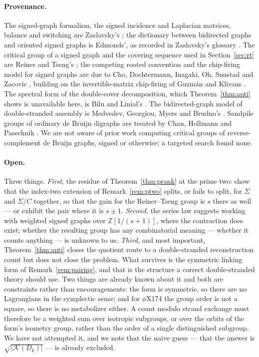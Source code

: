 \documentclass[11pt]{article}
\theoremstyle{plain}
\theoremstyle{definition}
\theoremstyle{remark}
\newcommand{\Z}{\mathbb{Z}}
\newcommand{\K}{\mathcal{K}}
\newcommand{\Sig}{\Sigma}
\begin{document}
\paragraph{Provenance.} The signed-graph formalism, the signed incidence and Laplacian
matrices, balance and switching are Zaslavsky's \cite{Zas82}; the dictionary between
bidirected graphs and oriented signed graphs is Edmonds', as recorded in Zaslavsky's glossary
\cite{Zas98}. The critical group of a signed graph and the covering sequence used in
Section~\ref{sec:rt} are Reiner and Tseng's \cite{RT14}; the competing rooted convention and
the chip-firing model for signed graphs are due to Cho, Dochtermann, Inagaki, Oh, Snustad and
Zacovic \cite{CDIOSZ}, building on the invertible-matrix chip-firing of Guzm\'an and Klivans
\cite{GK16}. The spectral form of the double-cover decomposition, which
Theorem~\ref{thm:anti} shows is unavailable here, is Bilu and Linial's \cite{BL06}. The
bidirected-graph model of double-stranded assembly is Medvedev, Georgiou, Myers and Brudno's
\cite{MGMB07}. Sandpile groups of ordinary de Bruijn digraphs are treated by Chan, Hollmann
and Pasechnik \cite{CHP15}. We are not aware of prior work computing critical groups of
reverse-complement de Bruijn graphs, signed or otherwise; a targeted search found none.

\paragraph{Open.} Three things.
\emph{First}, the residue of Theorem~\ref{thm:prank} at the prime two: show that the
index-two extension of Remark~\ref{rem:ptwo} splits, or fails to split, for $\Sig$ and
$\Sig/C$ together, so that the gain for the Reiner--Tseng group is $s$ there as well --- or
exhibit the pair where it is $s\pm1$.
\emph{Second}, the series law suggests working with weighted signed graphs over
$\Z[1/(s{+}1)]$, where the contraction does exist; whether the resulting group has any
combinatorial meaning --- whether it counts anything --- is unknown to us.
\emph{Third}, and most important, Theorem~\ref{thm:anti} closes the quotient route to a
double-stranded reconstruction count but does not close the problem. What survives is the
symmetric linking form of Remark~\ref{rem:pairing}, and that is the structure a correct
double-stranded theory should use. Two things are already known about it and both are
constraints rather than encouragements: the form is symmetric, so there are no Lagrangians
in the symplectic sense; and for $\phi$X174 the group order is not a square, so there is no
metabolizer either. A count modulo strand exchange must therefore be a weighted sum over
isotropic subgroups, or over the orbits of the form's isometry group, rather than the order
of a single distinguished subgroup. We have not attempted it, and we note that the naive
guess --- that the answer is $\sqrt{|\K(D_k)|}$ --- is already excluded.
\end{document}
